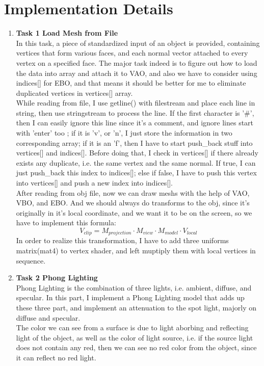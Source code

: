 \documentclass[acmtog]{acmart}
\begin{document}
\section{Implementation Details}
\begin{enumerate}
	\item \textbf{Task 1 Load Mesh from File}\\
	In this task, a piece of standardized input of an object is provided, containing vertices that form various faces, and each normal vector attached to every vertex on a specified face.
	The major task indeed is to figure out how to load the data into array and attach it to VAO, and also we have to consider using indices[] for EBO, and that means it should be better for me to eliminate duplicated vertices in vertices[] array. \\
	While reading from file, I use getline() with filestream and place each line in string, then use stringstream to process the line. If the first character is '\#', then I can easily ignore this line since it's a comment, and ignore lines start with 'enter' too ; if it is 'v', or 'n', 
	I just store the information in two corresponding array; 
	if it is an 'f', 
	then I have to start push\_back stuff
	into vertices[] and indices[]. Before doing that, I check in vertices[] if there already exists any duplicate, i.e. the same vertex and the same normal. If true, I can just push\_back this index to indices[]; else if false, I have to push this vertex into vertices[] and push a new index into indices[].\\
	After reading from obj file, now we can draw meshs with the help of VAO, VBO, and EBO. And we should always do transforms to the obj, since it's originally in it's local coordinate, and we want it to be on the screen, so we have to implement this formula:
	$$
	V_{clip}=M_{projection}\cdot M_{view} \cdot M_{model} \cdot V_{local}$$ 
	In order to realize this transformation, I have to add three uniforms matrix(mat4) to vertex shader, and left muptiply them with local vertices in sequence.
	\item \textbf{Task 2 Phong Lighting}\\
	Phong Lighting is the combination of three lights, i.e. ambient, diffuse, and specular. In this part, I implement a Phong Lighting model that adds up these three part, and 
	implement an attenuation to the spot light, majorly on diffuse and  specular.\\
	The color we can see from a surface is due to light aborbing and reflecting light of the object, as well as the color of light source, i.e. if the source light does not contain any red, then we can see no red color from the object, since it can reflect no red light.\\

\end{enumerate}
\end{document}
